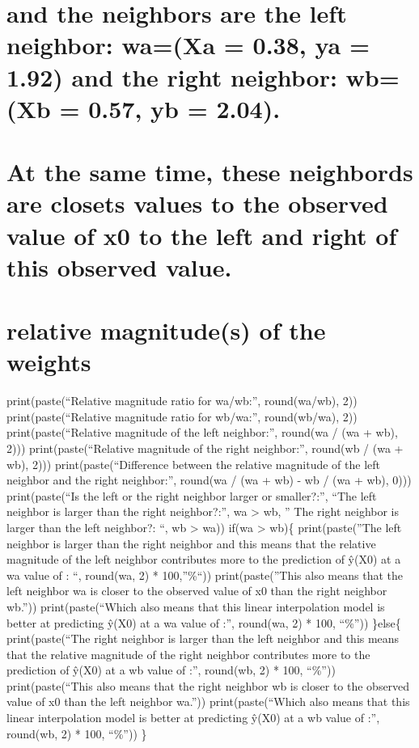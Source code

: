 \documentclass[
  letterpaper,
  DIV=11,
  numbers=noendperiod]{scrreprt}
\begin{document}
{

\chapter{and the neighbors are the left neighbor: wa=(Xa = 0.38, ya =
1.92) and the right neighbor: wb=(Xb = 0.57, yb =
2.04).}\label{and-the-neighbors-are-the-left-neighbor-waxa-0.38-ya-1.92-and-the-right-neighbor-wbxb-0.57-yb-2.04.}


\chapter{At the same time, these neighbords are closets values to the
observed value of x0 to the left and right of this observed
value.}\label{at-the-same-time-these-neighbords-are-closets-values-to-the-observed-value-of-x0-to-the-left-and-right-of-this-observed-value.}


\chapter{relative magnitude(s) of the
weights}\label{relative-magnitudes-of-the-weights}

print(paste(``Relative magnitude ratio for wa/wb:'', round(wa/wb), 2))
print(paste(``Relative magnitude ratio for wb/wa:'', round(wb/wa), 2))
print(paste(``Relative magnitude of the left neighbor:'', round(wa / (wa
+ wb), 2))) print(paste(``Relative magnitude of the right neighbor:'',
round(wb / (wa + wb), 2))) print(paste(``Difference between the relative
magnitude of the left neighbor and the right neighbor:'', round(wa / (wa
+ wb) - wb / (wa + wb), 0))) print(paste(``Is the left or the right
neighbor larger or smaller?:'', ``The left neighbor is larger than the
right neighbor?:'', wa \textgreater{} wb, '' The right neighbor is
larger than the left neighbor?: ``, wb \textgreater{} wa)) if(wa
\textgreater{} wb)\{ print(paste(''The left neighbor is larger than the
right neighbor and this means that the relative magnitude of the left
neighbor contributes more to the prediction of ŷ(X0) at a wa value of :
``, round(wa, 2) * 100,''\%``)) print(paste(''This also means that the
left neighbor wa is closer to the observed value of x0 than the right
neighbor wb.'')) print(paste(``Which also means that this linear
interpolation model is better at predicting ŷ(X0) at a wa value of :'',
round(wa, 2) * 100, ``\%'')) \}else\{ print(paste(``The right neighbor
is larger than the left neighbor and this means that the relative
magnitude of the right neighbor contributes more to the prediction of
ŷ(X0) at a wb value of :'', round(wb, 2) * 100, ``\%''))
print(paste(``This also means that the right neighbor wb is closer to
the observed value of x0 than the left neighbor wa.''))
print(paste(``Which also means that this linear interpolation model is
better at predicting ŷ(X0) at a wb value of :'', round(wb, 2) * 100,
``\%'')) \}

}
\end{document}

